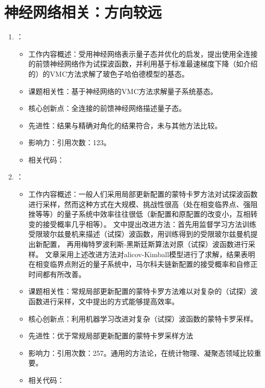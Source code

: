 \section{神经网络相关：方向较远}
    \begin{enumerate}
        \item \citet{saito2017solving}：
        \begin{itemize}
            \item 工作内容概述：受\citet{carleo2017solving}用神经网络表示量子态并优化的启发，提出使用全连接的前馈神经网络作为试探波函数，并利用基于标准最速梯度下降（如\citet{becca2017quantum}介绍的）的VMC方法求解了玻色子哈伯德模型的基态。
            \item 课题相关性：基于神经网络的VMC方法求解量子系统基态。
            \item 核心创新点：全连接的前馈神经网络描述量子态。
            \item 先进性：结果与精确对角化的结果符合，未与其他方法比较。
            \item 影响力：引用次数：123。
            \item 相关代码：
        \end{itemize}
        \item \citet{huang2017accelerated}：
        \begin{itemize}
            \item 工作内容概述：一般人们采用局部更新配置的蒙特卡罗方法对试探波函数进行采样，然而这种方式在大规模、挑战性很高（处在相变临界点、强阻挫等等）的量子系统中效率往往很低（新配置和原配置的改变小，互相转变的接受概率几乎相等）。
            文中提出改进方法：首先用监督学习方法训练受限玻尔兹曼机来描述（试探）波函数，用训练得到的受限玻尔兹曼机提出新配置，
            再用梅特罗波利斯-黑斯廷斯算法\citep{metropolis1953equation, hastings1970monte}对原（试探）波函数进行采样。
            文章采用上述改进方法对alicov-Kimball模型\citep{falicov1969simple}进行了求解，结果表明在相变临界点附近的量子系统中，马尔科夫链新配置的接受概率和自修正时间都有所改善。
            \item 课题相关性：常规局部更新配置的蒙特卡罗方法难以对复杂的（试探）波函数进行采样，文中提出的方式能够提高效率。
            \item 核心创新点：利用机器学习改进对复杂（试探）波函数的蒙特卡罗采样。
            \item 先进性：优于常规局部更新配置的蒙特卡罗采样方法
            \item 影响力：引用次数：257。通用的方法论，在统计物理、凝聚态领域比较重要。
            \item 相关代码：

\end{itemize}
\end{enumerate}
